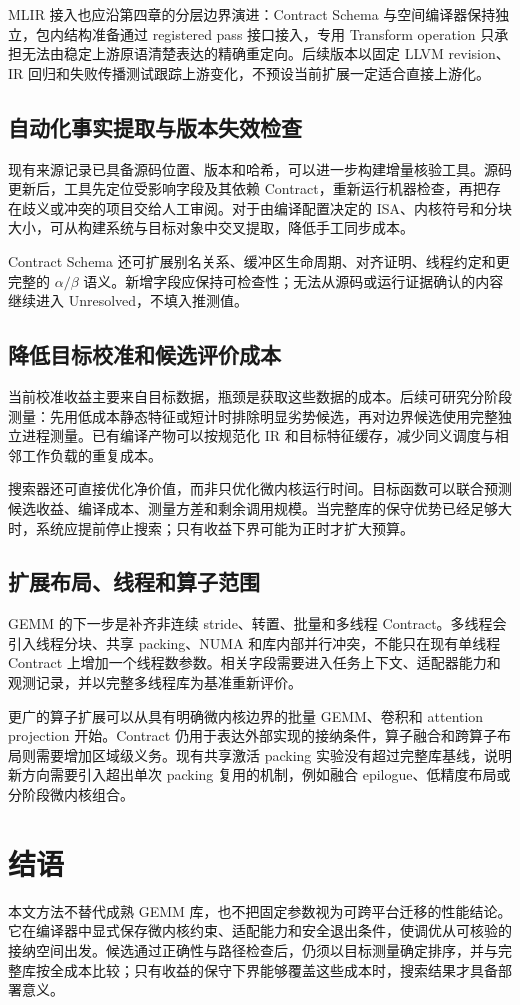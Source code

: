 MLIR 接入也应沿第四章的分层边界演进：Contract Schema 与空间编译器保持独立，包内结构准备通过 registered pass 接口接入，专用 Transform operation 只承担无法由稳定上游原语清楚表达的精确重定向。后续版本以固定 LLVM revision、IR 回归和失败传播测试跟踪上游变化，不预设当前扩展一定适合直接上游化。

\subsection{自动化事实提取与版本失效检查}

现有来源记录已具备源码位置、版本和哈希，可以进一步构建增量核验工具。源码更新后，工具先定位受影响字段及其依赖 Contract，重新运行机器检查，再把存在歧义或冲突的项目交给人工审阅。对于由编译配置决定的 ISA、内核符号和分块大小，可从构建系统与目标对象中交叉提取，降低手工同步成本。

Contract Schema 还可扩展别名关系、缓冲区生命周期、对齐证明、线程约定和更完整的 $\alpha/\beta$ 语义。新增字段应保持可检查性；无法从源码或运行证据确认的内容继续进入 Unresolved，不填入推测值。

\subsection{降低目标校准和候选评价成本}

当前校准收益主要来自目标数据，瓶颈是获取这些数据的成本。后续可研究分阶段测量：先用低成本静态特征或短计时排除明显劣势候选，再对边界候选使用完整独立进程测量。已有编译产物可以按规范化 IR 和目标特征缓存，减少同义调度与相邻工作负载的重复成本。

搜索器还可直接优化净价值，而非只优化微内核运行时间。目标函数可以联合预测候选收益、编译成本、测量方差和剩余调用规模。当完整库的保守优势已经足够大时，系统应提前停止搜索；只有收益下界可能为正时才扩大预算。

\subsection{扩展布局、线程和算子范围}

GEMM 的下一步是补齐非连续 stride、转置、批量和多线程 Contract。多线程会引入线程分块、共享 packing、NUMA 和库内部并行冲突，不能只在现有单线程 Contract 上增加一个线程数参数。相关字段需要进入任务上下文、适配器能力和观测记录，并以完整多线程库为基准重新评价。

更广的算子扩展可以从具有明确微内核边界的批量 GEMM、卷积和 attention projection 开始。Contract 仍用于表达外部实现的接纳条件，算子融合和跨算子布局则需要增加区域级义务。现有共享激活 packing 实验没有超过完整库基线，说明新方向需要引入超出单次 packing 复用的机制，例如融合 epilogue、低精度布局或分阶段微内核组合。

\section{结语}

本文方法不替代成熟 GEMM 库，也不把固定参数视为可跨平台迁移的性能结论。它在编译器中显式保存微内核约束、适配能力和安全退出条件，使调优从可核验的接纳空间出发。候选通过正确性与路径检查后，仍须以目标测量确定排序，并与完整库按全成本比较；只有收益的保守下界能够覆盖这些成本时，搜索结果才具备部署意义。
